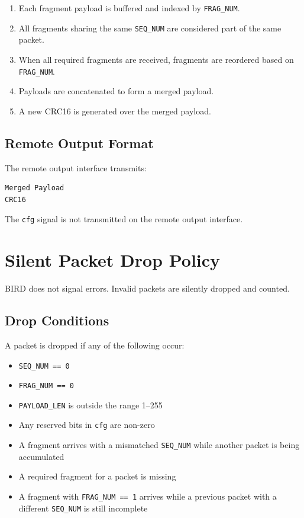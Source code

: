 \documentclass[11pt,a4paper]{article}
\begin{document}
\begin{enumerate}
  \item Each fragment payload is buffered and indexed by \texttt{FRAG\_NUM}.
  \item All fragments sharing the same \texttt{SEQ\_NUM} are considered part of the same packet.
  \item When all required fragments are received, fragments are reordered based on \texttt{FRAG\_NUM}.
  \item Payloads are concatenated to form a merged payload.
  \item A new CRC16 is generated over the merged payload.
\end{enumerate}

\subsection{Remote Output Format}

The remote output interface transmits:
\begin{verbatim}
Merged Payload
CRC16
\end{verbatim}

The \texttt{cfg} signal is not transmitted on the remote output interface.

\section{Silent Packet Drop Policy}

BIRD does not signal errors. Invalid packets are silently dropped and counted.

\subsection{Drop Conditions}

A packet is dropped if any of the following occur:
\begin{itemize}
  \item \texttt{SEQ\_NUM == 0}
  \item \texttt{FRAG\_NUM == 0}
  \item \texttt{PAYLOAD\_LEN} is outside the range 1--255
  \item Any reserved bits in \texttt{cfg} are non-zero
  \item A fragment arrives with a mismatched \texttt{SEQ\_NUM} while another packet is being accumulated
  \item A required fragment for a packet is missing
  \item A fragment with \texttt{FRAG\_NUM == 1} arrives while a previous packet with a different \texttt{SEQ\_NUM} is still incomplete
\end{itemize}
\end{document}
